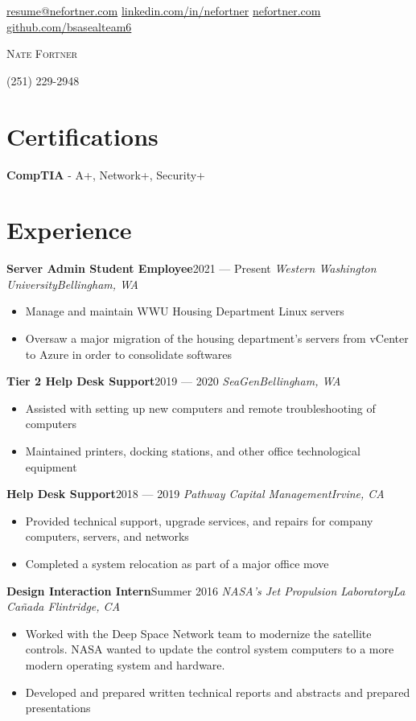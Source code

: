 \documentclass{article}
\newcommand{\alignicon}[2][nmbr]{\eqmakebox[#1]{\strut #2}}
\newcommand{\topLevelItem}[4]{
    \textbf{#1}\hfill #4\newline
    \emph{#2\hfill #3}\newline
    \vspace{-18pt}\begin{itemize}
}
\newcommand{\certificationType}[2]{
    \textbf{#1} - #2
}
\newcommand{\topLevelItemEnd}{\end{itemize}\vspace{5pt}}
\newcommand{\lowLevelItem}[1]{
    \item\small{#1}\vspace{-8pt}
}
\begin{document}
    \begin{center}
        \noindent\alignicon\faEnvelope\quad\href{mailto:resume@nefortner.com}{resume@nefortner.com}\hfill %
        \href{https://linkedin.com/in/nefortner}{linkedin.com/in/nefortner}\quad\alignicon\faLinkedin\newline %
        \alignicon\faGlobe\quad\href{https://nefortner.com}{nefortner.com}\hfill %
        \href{https://github.com/bsasealteam6}{github.com/bsasealteam6}\quad\alignicon\faGithub\vspace*{-0.33in} %
        
        {\fontsize{28}{0}\selectfont\scshape Nate Fortner}
    \end{center}
    \begin{center}
        (251) 229-2948\vspace{5pt}
    \end{center}
    \section*{Certifications}
        \certificationType{CompTIA}{A+, Network+, Security+}
    \section*{Experience}
        \topLevelItem{Server Admin Student Employee}{Western Washington University}{Bellingham, WA}{2021 — Present}
            \lowLevelItem{Manage and maintain WWU Housing Department Linux servers}
            \lowLevelItem{Oversaw a major migration of the housing department’s servers from vCenter to Azure in order to consolidate softwares}
        \topLevelItemEnd
        \topLevelItem{Tier 2 Help Desk Support}{SeaGen}{Bellingham, WA}{2019 — 2020}
            \lowLevelItem{Assisted with setting up new computers and remote troubleshooting of computers}
            \lowLevelItem{Maintained printers, docking stations, and other office technological equipment}
        \topLevelItemEnd
        \topLevelItem{Help Desk Support}{Pathway Capital Management}{Irvine, CA}{2018 — 2019}
            \lowLevelItem{Provided technical support, upgrade services, and repairs for company computers, servers, and networks}
            \lowLevelItem{Completed a system relocation as part of a major office move}
        \topLevelItemEnd
        \topLevelItem{Design Interaction Intern}{NASA's Jet Propulsion Laboratory}{La Ca\~{n}ada Flintridge, CA}{Summer 2016}
            \lowLevelItem{Worked with the Deep Space Network team to modernize the satellite controls. NASA wanted to update the control system computers to a more modern operating system and hardware.}
            \lowLevelItem{Developed and prepared written technical reports and abstracts and prepared presentations}
        \topLevelItemEnd
\end{document}
